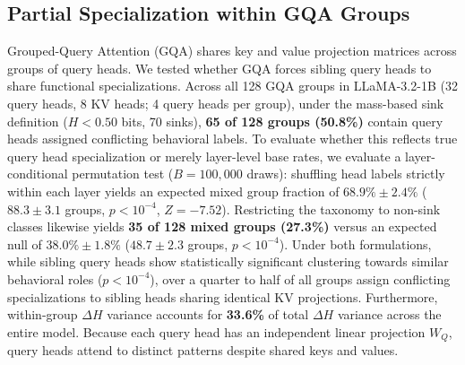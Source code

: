 \documentclass[11pt]{article}
\begin{document}
\subsection{Partial Specialization within GQA Groups}
Grouped-Query Attention (GQA) shares key and value projection matrices across groups of query heads. We tested whether GQA forces sibling query heads to share functional specializations. Across all 128 GQA groups in LLaMA-3.2-1B (32 query heads, 8 KV heads; 4 query heads per group), under the mass-based sink definition ($H < 0.50$ bits, 70 sinks), \textbf{65 of 128 groups (50.8\%)} contain query heads assigned conflicting behavioral labels. To evaluate whether this reflects true query head specialization or merely layer-level base rates, we evaluate a layer-conditional permutation test ($B=100,000$ draws): shuffling head labels strictly within each layer yields an expected mixed group fraction of $68.9\% \pm 2.4\%$ ($88.3 \pm 3.1$ groups, $p < 10^{-4}$, $Z = -7.52$). Restricting the taxonomy to non-sink classes likewise yields \textbf{35 of 128 mixed groups (27.3\%)} versus an expected null of $38.0\% \pm 1.8\%$ ($48.7 \pm 2.3$ groups, $p < 10^{-4}$). Under both formulations, while sibling query heads show statistically significant clustering towards similar behavioral roles ($p < 10^{-4}$), over a quarter to half of all groups assign conflicting specializations to sibling heads sharing identical KV projections. Furthermore, within-group $\Delta H$ variance accounts for \textbf{33.6\%} of total $\Delta H$ variance across the entire model. Because each query head has an independent linear projection $W_Q$, query heads attend to distinct patterns despite shared keys and values.
\end{document}
